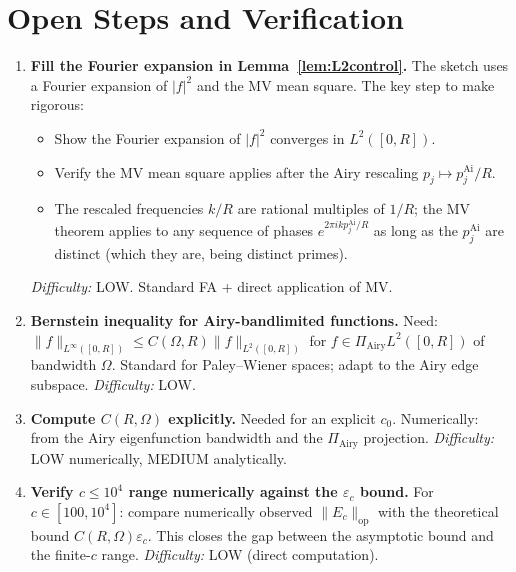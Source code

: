 \documentclass[12pt,a4paper]{amsart}
\theoremstyle{definition}
\newcommand{\PAi}{\Pi_{\mathrm{Airy}}}
\newcommand{\norm}[1]{\|#1\|}
\newcommand{\Ec}{E_c}
\begin{document}
\section{Open Steps and Verification}
\label{sec:open}

\begin{enumerate}
\item[\textbf{V1}] \textbf{Fill the Fourier expansion in Lemma~\ref{lem:L2control}.}
The sketch uses a Fourier expansion of $|f|^2$ and the MV mean square.
The key step to make rigorous:
\begin{itemize}
  \item Show the Fourier expansion of $|f|^2$ converges in $L^2([0,R])$.
  \item Verify the MV mean square applies after the Airy rescaling $p_j \mapsto p_j^{\mathrm{Ai}}/R$.
  \item The rescaled frequencies $k/R$ are rational multiples of $1/R$;
    the MV theorem applies to any sequence of phases $e^{2\pi i k p_j^{\mathrm{Ai}}/R}$
    as long as the $p_j^{\mathrm{Ai}}$ are distinct (which they are, being distinct primes).
\end{itemize}
\emph{Difficulty:} LOW. Standard FA + direct application of MV.

\item[\textbf{V2}] \textbf{Bernstein inequality for Airy-bandlimited functions.}
Need: $\norm{f}_{L^\infty([0,R])} \le C(\Omega,R) \norm{f}_{L^2([0,R])}$
for $f \in \PAi L^2([0,R])$ of bandwidth $\Omega$.
Standard for Paley--Wiener spaces; adapt to the Airy edge subspace.
\emph{Difficulty:} LOW.

\item[\textbf{V3}] \textbf{Compute $C(R, \Omega)$ explicitly.}
Needed for an explicit $c_0$.
Numerically: from the Airy eigenfunction bandwidth and the $\PAi$ projection.
\emph{Difficulty:} LOW numerically, MEDIUM analytically.

\item[\textbf{V4}] \textbf{Verify $c \le 10^4$ range numerically against the $\varepsilon_c$ bound.}
For $c \in [100, 10^4]$: compare numerically observed $\norm{\Ec}_{\mathrm{op}}$
with the theoretical bound $C(R,\Omega)\varepsilon_c$.
This closes the gap between the asymptotic bound and the finite-$c$ range.
\emph{Difficulty:} LOW (direct computation).
\end{enumerate}
\end{document}
